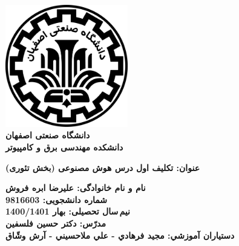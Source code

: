 \begin{titlepage}
\begin{center}
\includegraphics[width=0.4\textwidth]{figures/IUT Logo.png}\\
        
\LARGE
\textbf{دانشگاه صنعتی اصفهان}\\
\textbf{دانشکده مهندسی برق و کامپیوتر}\\
        
\vfill
        
\huge
\textbf{عنوان: تکلیف اول درس هوش مصنوعی (بخش تئوری)}\\
        
\vfill
        
\LARGE
\textbf{نام و نام خانوادگی: علیرضا ابره فروش}\\
\textbf{شماره دانشجویی: 9816603}\\
\textbf{نیم\,سال تحصیلی: بهار 1400/1401}\\
\textbf{مدرّس: دکتر حسین فلسفین}\\
\textbf{دستياران آموزشي: مجيد فرهادي - علي ملاحسيني - آرش وشّاق}\\
\end{center}
\end{titlepage}
